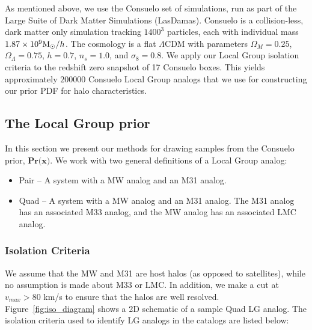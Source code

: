 \documentclass[iop,apj,twocolappendix,numberedappendix]{emulateapj}
\newcommand{\Msun}{{\rm M}_\odot}
\newcommand{\consuelo}{{\sc Consuelo }}
\def\Fref#1{Figure~\ref{#1}}
\newcommand{\todo}[2]{{\bf To do (#1): #2}}
\begin{document}
As mentioned above, we use the \consuelo set of simulations, run as part of the Large Suite of Dark Matter Simulations (LasDamas). \consuelo is a collision-less, dark matter only simulation tracking $1400^{3}$ particles, each with individual mass $1.87\times10^{9} \Msun /h$. The cosmology is a flat $\Lambda$CDM with parameters $\Omega_{M}=0.25$, $\Omega_{\Lambda}=0.75$, $h=0.7$, $n_{s}=1.0$, and $\sigma_{8}=0.8$.  
We apply our Local Group isolation criteria to the redshift zero snapshot of 17 \consuelo boxes.
This yields approximately $200000$ \consuelo Local Group analogs that we use for constructing our prior PDF for halo characteristics.





\subsection{The Local Group prior}
\label{sec:lg_prior}

In this section we present our methods for drawing samples from the \consuelo prior, $\textbf{Pr(x)}$.  We work with two general definitions of a Local Group analog:
\begin{itemize}
\item Pair -- A system with a MW analog and an M31 analog.
\item Quad -- A system with a MW analog and an M31 analog.  The M31 analog has an associated M33 analog, and the MW analog has an associated LMC analog.
\end{itemize}
  

\subsubsection{Isolation Criteria}
\label{sec:iso_crit}

We assume that the MW and M31 are host halos (as opposed to satellites), while no assumption is made about M33 or LMC. In addition, we make a cut at $v_{max} > 80$ km/s to ensure that the halos are well resolved. 
\Fref{fig:iso_diagram} shows a 2D schematic of a sample Quad LG analog.
The isolation criteria used to identify LG analogs in the catalogs are listed below:
\end{document}

